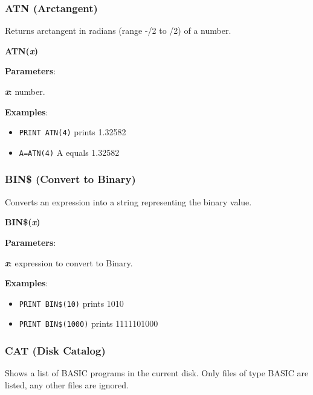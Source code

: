     \subsubsection{{ATN (Arctangent)}}
    \label{msbasic:lang:atn}
    Returns arctangent in radians (range -\textpi/2 to \textpi/2) of a number.

    \hspace{1.9cm}\textbf{ATN(\textit{x})}

    \textbf{Parameters}:

    \hspace{1cm}\textbf{\textit{x}}: number.

    \textbf{Examples}:
    \begin{itemize}
        \item \texttt{PRINT ATN(4)} prints 1.32582
        \item \texttt{A=ATN(4)} A equals 1.32582
    \end{itemize}

    \subsubsection{{BIN\$ (Convert to Binary)}}
    \label{msbasic:lang:bin}
    Converts an expression into a string representing the binary value.

    \hspace{1.9cm}\textbf{BIN\$(\textit{x})}

    \textbf{Parameters}:

    \hspace{1cm}\textbf{\textit{x}}: expression to convert to Binary.

    \textbf{Examples}:
    \begin{itemize}
        \item \texttt{PRINT BIN\$(10)} prints 1010
        \item \texttt{PRINT BIN\$(1000)} prints 1111101000
    \end{itemize}

    \subsubsection{{CAT (Disk Catalog)}}
    \label{msbasic:lang:cat}
    Shows a list of BASIC programs in the current disk. Only files of type
    BASIC are listed, any other files are ignored.

